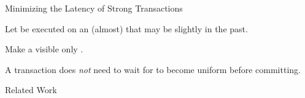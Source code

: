\begin{frame}{Minimizing the Latency of Strong Transactions}
  \begin{center}
    Let  be executed on an (almost)
     that may be slightly in the past.

    \vspace{0.50cm}

    \pause
    \vspace{0.30cm}
    Make a   visible
    only .

    \pause
    \vspace{0.30cm}
    A  transaction does \emph{not}
    need to wait for  
    to become uniform before committing.
  \end{center}
\end{frame}

\begin{frame}{Related Work}
\end{frame}
